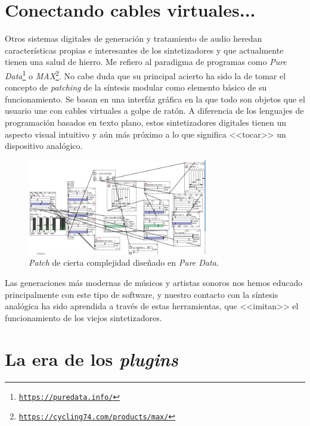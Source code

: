\section{Conectando cables virtuales...}

Otros sistemas digitales de generación y tratamiento de audio heredan características propias e interesantes de los sintetizadores y que actualmente tienen una salud de hierro. Me refiero al paradigma de programas como \emph{Pure Data}\footnote{\href{https://puredata.info/}{\texttt{https://puredata.info/}}} o \emph{MAX}\footnote{\href{https://cycling74.com/products/max/}{\texttt{https://cycling74.com/products/max/}}}. No cabe duda que su principal acierto ha sido la de tomar el concepto de \emph{patching} de la síntesis modular como elemento básico de su funcionamiento. Se basan en una interfáz gráfica en la que todo son objetos que el usuario une con cables virtuales a golpe de ratón. A diferencia de los lenguajes de programación basados en texto plano, estos sintetizadores digitales tienen un aspecto visual intuitivo y aún más próximo a lo que significa <<tocar>> un dispositivo analógico. 

\begin{figure}
	\centering
	\includegraphics[width=0.7\textwidth]{./puredata_modular}
	\caption[\textit{Patch} en \textit{Pure Data}]{\textit{Patch} de cierta complejidad diseñado en \textit{Pure Data. }}
	\label{fig:puredata_modular}
\end{figure}

Las generaciones más modernas de músicos y artistas sonoros nos hemos educado principalmente con este tipo de software, y nuestro contacto con la síntesis analógica ha sido aprendida a través de estas herramientas, que <<imitan>> el funcionamiento de los viejos sintetizadores.

\section{La era de los \textit{plugins}}
\label{sec:plugins}

